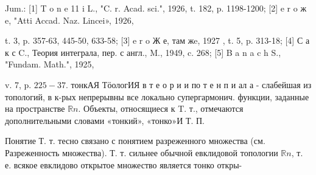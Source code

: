 \documentclass[10pt]{article}
\begin{document}
Jum.: [1] T o n e 11 i L., "C. r. Acad. sci.", 1926, t. 182, p. 1198-1200; [2] e r o ж e, "Atti Accad. Naz. Lincei», 1926,

t. 3, p. 357-63, 445-50, 633-58; [3] e r o Ж е, там жe, 1927 , t. 5, p. 313-18; [4] С а к с C., Теория интеграла, пер. с англ., M., 1949, c. 268; [5] B a n a c h S., "Fundam. Math.", 1925,

v. 7, p. $225-37$. тонкАЯ ТӧологИЯ в т е о р и и по т е н п и ал а - слабейшая из топологий, в к-рых непрерывны все локально супергармонич. функции, заданные на пространстве $\mathbb{R} n$. Объекты, относящиеся к T. т., отмечаются дополнительными словами «тонкий», «тонко»И Т. П.



Понятие Т. т. тесно связано с понятием разреженного множества (см. Разреженность множества). Т. т. сильнее обычной евклидовой топологии $\mathbb{R} n$, т. е. всякое евклидово открытое множество является тонко откры-
\end{document}

